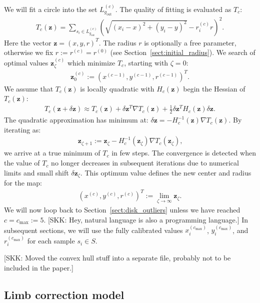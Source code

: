 \documentclass{aa}
\newcommand{\skk}[1]{\textcolor{midorange}{[SKK: #1]}} %
\newcommand{\eqnl}[2]{\begin{eqnarray}\label{#1}#2\end{eqnarray}}
\newcommand{\s}[2]{{#1}_{\mathrm{#2}}}
\begin{document}
  We will fit a circle into the set $L^{(c)}_{\s{g}{out}}$. The quality of fitting is evaluated as $T_c$:
  \eqnl{subsequent_centering1}{
  T_c(\bm{z}) = \sum \limits_{s_i \in L^{(c)}_{\s{g}{out}}} \left( \sqrt{\left( x_i - x \right)^2 + \left( y_i - y \right)^2} - r_i^{(c)} r \right)^2 \text{.}
  }
  Here the vector $\bm{z} = \left( x, y, r \right)^T$.
  The radius $r$ is optionally a free parameter, otherwise we fix $r := r^{(c)} = r^{(0)}$ (see 
  Section~\ref{sect:initial_radius}). We search of optimal values $\bm{z}_{\zeta}^{(c)}$ which minimize $T_c$, starting with $\zeta=0$:
  \eqnl{subsequent_centering2}{
  \bm{z}_0^{(c)} := \left( x^{(c-1)}, y^{(c-1)}, r^{(c-1)} \right)^T \text{.}
  }
  We assume that $T_c(\bm{z})$ is locally quadratic with $H_c(\bm{z})$ begin the Hessian of $T_c(\bm{z})$:
  \eqnl{subsequent_centering3}{
  T_c(\bm{z}+\delta \bm{z}) \approx T_c(\bm{z}) + \delta \bm{z}^T \nabla T_c(\bm{z}) + \frac{1}{2} \delta \bm{z}^T H_c(\bm{z}) \delta \bm{z} \text{.}
  }
  The quadratic approximation has minimum at: $\delta \bm{z} = -H_c^{-1}(\bm{z}) \nabla T_c(\bm{z})$. By iterating as:
  \eqnl{subsequent_centering4}{
  \bm{z}_{\zeta+1} := \bm{z}_{\zeta} - H_c^{-1}(\bm{z}_{\zeta}) \nabla T_c(\bm{z}_{\zeta}) \text{,}
  }
  we arrive at a true minimum of $T_c$ in few steps. The convergence is detected when the value of $T_c$ no longer 
  decreases in subsequent iterations due to numerical limits and small shift $\delta \bm{z}_{\zeta}$. This optimum value defines the new center and radius for the map:
  \eqnl{subsequent_centering5}{
  \left( x^{(c)}, y^{(c)}, r^{(c)} \right)^T := \lim \limits_{\zeta \to \infty} \bm{z}_{\zeta} \text{.}
  }
  We will now loop back to Section~\ref{sect:disk_outliers} unless we have reached $c = \s{c}{max} := 5$. \skk{Hey, natural language is also a programming language.}
  In subsequent sections, we will use the fully calibrated values $x_i^{(\s{c}{max})}$, $y_i^{(\s{c}{max})}$, and $r_i^{(\s{c}{max})}$ for each sample $s_i \in S$.

\skk{Moved the convex hull stuff into a separate file, probably not to be included in the paper.}

\subsection{Limb correction model}\label{sect:limb}
\end{document}
